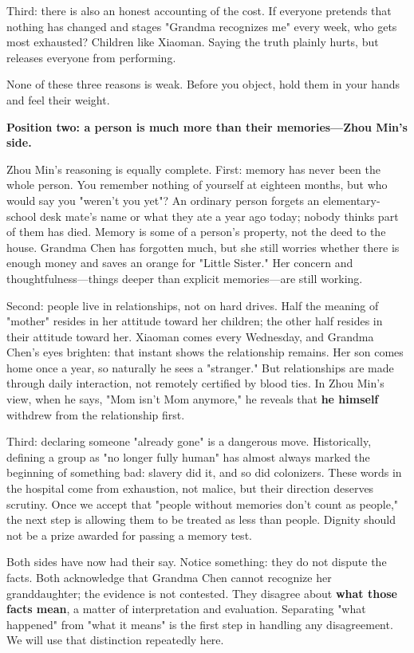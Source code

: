 Third: there is also an honest accounting of the cost. If everyone pretends that nothing has changed and stages "Grandma recognizes me" every week, who gets most exhausted? Children like Xiaoman. Saying the truth plainly hurts, but releases everyone from performing.

None of these three reasons is weak. Before you object, hold them in your hands and feel their weight.

\textbf{Position two: a person is much more than their memories---Zhou Min's side.}

Zhou Min's reasoning is equally complete. First: memory has never been the whole person. You remember nothing of yourself at eighteen months, but who would say you "weren't you yet"? An ordinary person forgets an elementary-school desk mate's name or what they ate a year ago today; nobody thinks part of them has died. Memory is some of a person's property, not the deed to the house. Grandma Chen has forgotten much, but she still worries whether there is enough money and saves an orange for "Little Sister." Her concern and thoughtfulness---things deeper than explicit memories---are still working.

Second: people live in relationships, not on hard drives. Half the meaning of "mother" resides in her attitude toward her children; the other half resides in their attitude toward her. Xiaoman comes every Wednesday, and Grandma Chen's eyes brighten: that instant shows the relationship remains. Her son comes home once a year, so naturally he sees a "stranger." But relationships are made through daily interaction, not remotely certified by blood ties. In Zhou Min's view, when he says, "Mom isn't Mom anymore," he reveals that \textbf{he himself} withdrew from the relationship first.

Third: declaring someone "already gone" is a dangerous move. Historically, defining a group as "no longer fully human" has almost always marked the beginning of something bad: slavery did it, and so did colonizers. These words in the hospital come from exhaustion, not malice, but their direction deserves scrutiny. Once we accept that "people without memories don't count as people," the next step is allowing them to be treated as less than people. Dignity should not be a prize awarded for passing a memory test.

Both sides have now had their say. Notice something: they do not dispute the facts. Both acknowledge that Grandma Chen cannot recognize her granddaughter; the evidence is not contested. They disagree about \textbf{what those facts mean}, a matter of interpretation and evaluation. Separating "what happened" from "what it means" is the first step in handling any disagreement. We will use that distinction repeatedly here.

